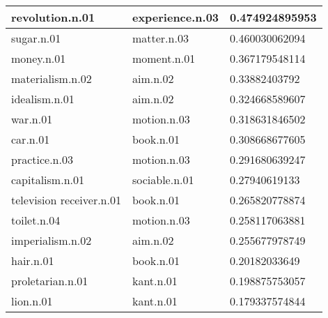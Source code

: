 \begin{center}
\begin{tabular}{ | l | l | l |}
revolution.n.01 & experience.n.03 & 0.474924895953 \\ \hline
sugar.n.01 & matter.n.03 & 0.460030062094 \\ \hline
money.n.01 & moment.n.01 & 0.367179548114 \\ \hline
materialism.n.02 & aim.n.02 & 0.33882403792 \\ \hline
idealism.n.01 & aim.n.02 & 0.324668589607 \\ \hline
war.n.01 & motion.n.03 & 0.318631846502 \\ \hline
car.n.01 & book.n.01 & 0.308668677605 \\ \hline
practice.n.03 & motion.n.03 & 0.291680639247 \\ \hline
capitalism.n.01 & sociable.n.01 & 0.27940619133 \\ \hline
television receiver.n.01 & book.n.01 & 0.265820778874 \\ \hline
toilet.n.04 & motion.n.03 & 0.258117063881 \\ \hline
imperialism.n.02 & aim.n.02 & 0.255677978749 \\ \hline
hair.n.01 & book.n.01 & 0.20182033649 \\ \hline
proletarian.n.01 & kant.n.01 & 0.198875753057 \\ \hline
lion.n.01 & kant.n.01 & 0.179337574844 \\ \hline
\end{tabular}
\end{center}